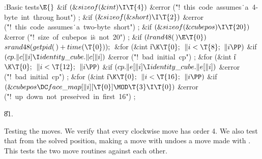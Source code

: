 \Y\B\4:Basic tests\X${}\E{}$\6
\&{if} ${}(\&{sizeof}(\&{int})\I\T{4}){}$\1\6
\&{error} (\.{"!\ this\ code\ assumes}\)\.{\ a\ 4-byte\ int\ throug}\)%
\.{hout"})\1\5
;\2\2\6
\&{if} ${}(\&{sizeof}(\&{short})\I\T{2}){}$\1\6
\&{error} (\.{"!\ this\ code\ assumes}\)\.{\ a\ two-byte\ short"})\1\5
;\2\2\6
\&{if} ${}(\&{sizeof}(\&{cubepos})\I\T{20}){}$\1\6
\&{error} (\.{"!\ size\ of\ cubepos\ i}\)\.{s\ not\ 20"})\1\5
;\2\2\6
\&{if} ${}(\\{lrand48}(\,)\E\T{0}){}$\1\5
${}\\{srand48}(\\{getpid}(\,)+\\{time}(\T{0}));{}$\2\6
\&{for} (\&{int} \|i${}\K\T{0};{}$ ${}\|i<\T{8};{}$ ${}\|i\PP){}$\1\6
\&{if} ${}(\\{cp}.\|c[\|i]\I\\{identity\_cube}.\|c[\|i]){}$\1\6
\&{error} (\.{"!\ bad\ initial\ cp"})\1\5
;\2\2\2\6
\&{for} (\&{int} \|i${}\K\T{0};{}$ ${}\|i<\T{12};{}$ ${}\|i\PP){}$\1\6
\&{if} ${}(\\{cp}.\|e[\|i]\I\\{identity\_cube}.\|e[\|i]){}$\1\6
\&{error} (\.{"!\ bad\ initial\ cp"})\1\5
;\2\2\2\6
\&{for} (\&{int} \|i${}\K\T{0};{}$ ${}\|i<\T{16};{}$ ${}\|i\PP){}$\1\6
\&{if} ${}(\&{cubepos}\DC\\{face\_map}[\|i][\T{0}]\MOD\T{3}\I\T{0}){}$\1\6
\&{error} (\.{"!\ up\ down\ not\ prese}\)\.{rved\ in\ first\ 16"})\1\5
;\2\2\2\par
\U81.\fi

Testing the moves.  We verify that every clockwise move has order 4.
We also test that from the solved position, making a move with
 undoes a move made with .  This tests the two move
routines against each other.

